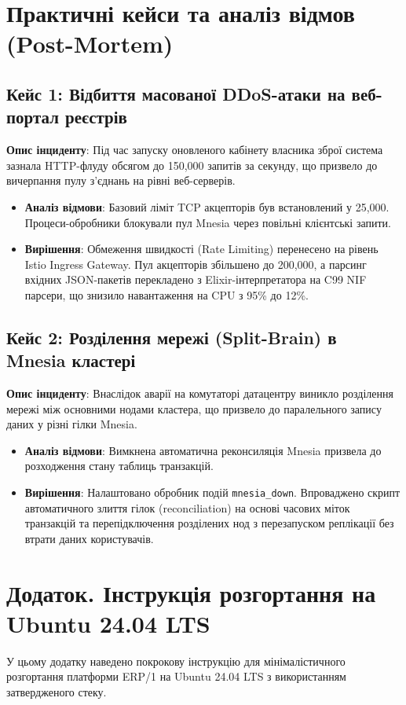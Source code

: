 \documentclass{article}
\begin{document}
\section{Практичні кейси та аналіз відмов (Post-Mortem)}

\subsection{Кейс 1: Відбиття масованої DDoS-атаки на веб-портал реєстрів}
\textbf{Опис інциденту}: Під час запуску оновленого кабінету власника зброї система зазнала HTTP-флуду обсягом до 150,000 запитів за секунду, що призвело до вичерпання пулу з'єднань на рівні веб-серверів.
\begin{itemize}
    \item \textbf{Аналіз відмови}: Базовий ліміт TCP акцепторів був встановлений у 25,000. Процеси-обробники блокували пул Mnesia через повільні клієнтські запити.
    \item \textbf{Вирішення}: Обмеження швидкості (Rate Limiting) перенесено на рівень Istio Ingress Gateway. Пул акцепторів збільшено до 200,000, а парсинг вхідних JSON-пакетів перекладено з Elixir-інтерпретатора на C99 NIF парсери, що знизило навантаження на CPU з 95\% до 12\%.
\end{itemize}

\subsection{Кейс 2: Розділення мережі (Split-Brain) в Mnesia кластері}
\textbf{Опис інциденту}: Внаслідок аварії на комутаторі датацентру виникло розділення мережі між основними нодами кластера, що призвело до паралельного запису даних у різні гілки Mnesia.
\begin{itemize}
    \item \textbf{Аналіз відмови}: Вимкнена автоматична реконсиляція Mnesia призвела до розходження стану таблиць транзакцій.
    \item \textbf{Вирішення}: Налаштовано обробник подій \texttt{mnesia\_down}. Впроваджено скрипт автоматичного злиття гілок (reconciliation) на основі часових міток транзакцій та перепідключення розділених нод з перезапуском реплікації без втрати даних користувачів.
\end{itemize}

\section{Додаток. Інструкція розгортання на Ubuntu 24.04 LTS}
\label{appendix:deploy}
У цьому додатку наведено покрокову інструкцію для мінімалістичного розгортання платформи ERP/1 на Ubuntu 24.04 LTS з використанням затвердженого стеку.
\end{document}

